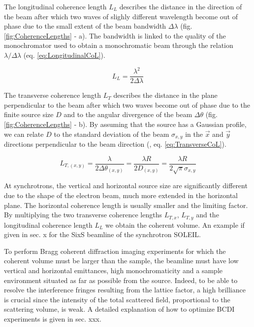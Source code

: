 The longitudinal coherence length $L_L$ describes the distance in the direction of the beam after which two waves of slighly different wavelength become out of phase due to the small extent of the beam bandwidth $\Delta\lambda$ (fig. \ref{fig:CoherenceLengths} - a).
The bandwidth is linked to the quality of the monochromator used to obtain a monochromatic beam through the relation $\lambda/\Delta\lambda$ (eq. \ref{eq:LongitudinalCoL}).

\begin{equation}
    \label{eq:LongitudinalCoL}
    L_L = \frac{\lambda^2}{2\Delta\lambda}
\end{equation}

The transverse coherence length $L_T$ describes the distance in the plane perpendicular to the beam after which two waves become out of phase due to the finite source size $D$ and to the angular divergence of the beam $\Delta\theta$ (fig. \ref{fig:CoherenceLengths} - b).
By assuming that the source has a Gaussian profile, we can relate $D$ to the standard deviation of the beam $\sigma_{x,y}$ in the $\vec{x}$ and $\vec{y}$ directions perpendicular to the beam direction (\cite{Willmott}, eq. \ref{eq:TransverseCoL}).

\begin{equation}
    \label{eq:TransverseCoL}
    L_{T,(x,y)} = \frac{\lambda}{2\Delta\theta_{(x,y)}} = \frac{\lambda R}{2 D_{(x,y)}} = \frac{\lambda R}{2\sqrt{\pi}\sigma_{x,y}}
\end{equation}

At synchrotrons, the vertical and horizontal source size are significantly different due to the shape of the electron beam, much more extended in the horizontal plane.
The horizontal coherence length is usually smaller and the limiting factor.
By multiplying the two transverse coherence lengths $L_{T,x}$, $L_{T,y}$ and the longitudinal coherence length $L_L$ we obtain the coherent volume.
An example if given in sec. x for the SixS beamline of the synchrotron SOLEIL.

To perform Bragg coherent diffraction imaging experiments for which the coherent volume must be larger than the sample, the beamline must have low vertical and horizontal emittances, high monochromaticity and a sample environment situated as far as possible from the source.
Indeed, to be able to resolve the interference fringes resulting from the lattice factor, a high brilliance is crucial since the intensity of the total scattered field, proportional to the scattering volume, is weak.
A detailed explanation of how to optimize BCDI experiments is given in sec. xxx.

